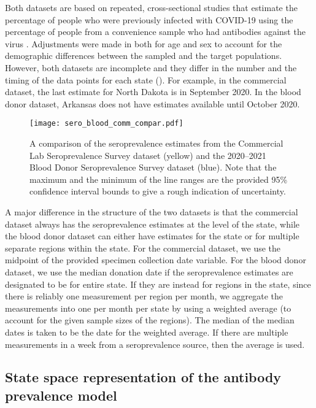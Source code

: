 Both datasets are based on repeated, cross-sectional studies that estimate the
percentage of people who were previously infected with COVID-19 using the
percentage of people from a convenience sample who had antibodies against the
virus \citep{bajema2021estimated, cdc2020data, jones2021estimated}. Adjustments
were made in both for age and sex to account for the demographic differences
between the sampled and the target populations. However, both datasets are
incomplete and they differ in the number and the timing of the data points for
each state (). For example, in the
commercial dataset, the last estimate for North Dakota is in September 2020. In
the blood donor dataset, Arkansas does not have estimates available until
October 2020. 

\begin{figure}[!tb]
\centering
    \texttt{[image: sero\_blood\_comm\_compar.pdf]}
    \caption{A comparison of the seroprevalence estimates from the Commercial
    Lab Seroprevalence Survey dataset (yellow) and the 2020--2021 Blood Donor 
    Seroprevalence Survey dataset (blue). Note that the maximum and the minimum
    of the line ranges are the provided 95\% confidence interval bounds to 
    give a rough indication of uncertainty.}
    \label{fig:sero-blood-comm-compar}
\end{figure}
    
A major difference in the structure of the two datasets is that the commercial
dataset always has the seroprevalence estimates at the level of the state, while
the blood donor dataset can either have estimates for the state or for multiple
separate regions within the state. For the commercial dataset, we use the
midpoint of the provided specimen collection date variable.  For the blood donor
dataset, we use the median donation date if the seroprevalence estimates are
designated to be for entire state. If they are instead for regions in the state,
since there is reliably one measurement per region per month, we aggregate the
measurements into one per month per state by using a weighted average (to
account for the given sample sizes of the regions). The median of the median
dates is taken to be the date for the weighted average. If there are multiple
measurements in a week from a seroprevalence source, then the average is used.


\subsection{State space representation of the antibody prevalence
model}\label{supp:ssapm} 


